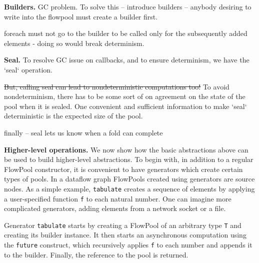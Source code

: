 \documentclass[runningheads,a4paper]{llncs}
\begin{document}
\textbf{Builders.}
GC problem.
To solve this -- introduce builders -- anybody desiring to write into
the flowpool must create a builder first.

foreach must not go to the builder to be called only for the
subsequently added elements - doing so would break determinism.


\textbf{Seal.}
To resolve GC issue on callbacks, and to ensure determinism, we have the `seal` operation.


\sout{But, calling seal can lead to nondeterministic computations too!} 
To avoid nondeterminism, there has to be some sort of on agreement on the
state of the pool when it is sealed. One convenient and sufficient information
to make `seal` deterministic is the expected size of the pool.

finally -- seal lets us know when a fold can complete

\textbf{Higher-level operations.}
We now show how the basic abstractions above can be used
to build higher-level abstractions.
To begin with, in addition to a regular FlowPool constructor, it is
convenient to have generators which create certain types of pools.
In a dataflow graph FlowPools created using generators
are source nodes.
As a simple example, \verb=tabulate= creates a sequence of elements
by applying a user-specified function \verb=f= to each natural number.
One can imagine more complicated generators, adding elements from a
network socket or a file.

Generator \verb=tabulate= starts by creating a FlowPool of an
arbitrary type \verb=T= and creating its builder instance.
It then starts an asynchronous computation using the \verb=future=
construct, which recursively applies \verb=f= to each number and
appends it to the builder.
Finally, the reference to the pool is returned.
\end{document}
